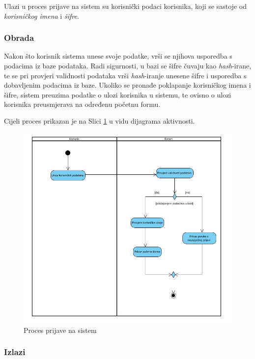 \documentclass[12pt,a4paper]{article}
\begin{document}
Ulazi u proces prijave na sistem su korisnički podaci korisnika, koji se sastoje od \textit{korisničkog imena} i \textit {šifre}.

\subsubsection{Obrada}

Nakon što korisnik sistema unese svoje podatke, vrši se njihova usporedba s podacima iz baze podataka. Radi sigurnosti, u bazi se šifre čuvaju kao \textit{hash}-irane, te se pri provjeri validnosti podataka vrši \textit{hash}-iranje unesene šifre i usporedba s dobavljenim podacima iz baze. Ukoliko se pronađe poklapanje korisničkog imena i šifre, sistem preuzima podatke o ulozi korisnika u sistemu, te ovisno o ulozi korisnika preusmjerava na određenu početnu formu.

Cijeli proces prikazan je na Slici \ref{act1} u vidu dijagrama aktivnosti.

\begin{figure}[H]
\center
\includegraphics[scale=0.5]{../res/Activity/activity1.JPG}
\caption{Proces prijave na sistem}
\label{act1}
\end{figure}

\subsubsection{Izlazi}
\end{document}
